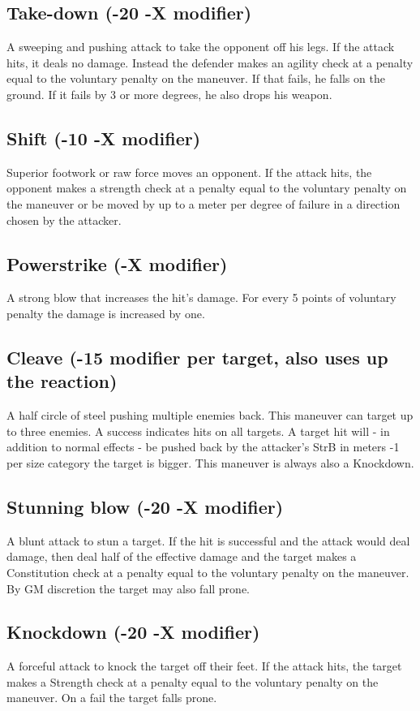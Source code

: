 \documentclass[12pt,a4paper,openany]{book}
\begin{document}
	\subsection*{Take-down (-20 -X modifier)}
	A sweeping and pushing attack to take the opponent off his legs. If the attack hits, it deals no damage. Instead the defender makes an agility check at a penalty equal to the voluntary penalty on the maneuver. If that fails, he falls on the ground. If it fails by 3 or more degrees, he also drops his weapon.
	\subsection*{Shift (-10 -X modifier)}
	Superior footwork or raw force moves an opponent. If the attack hits, the opponent makes a strength check at a penalty equal to the voluntary penalty on the maneuver or be moved by up to a meter per degree of failure in a direction chosen by the attacker.
	\subsection*{Powerstrike (-X modifier)}
	A strong blow that increases the hit’s damage. For every 5 points of voluntary penalty the damage is increased by one.
	\subsection*{Cleave (-15 modifier per target, also uses up the reaction)}
	A half circle of steel pushing multiple enemies back. This maneuver can target up to three enemies. A success indicates hits on all targets. A target hit will - in addition to normal effects - be pushed back by the attacker’s StrB in meters -1 per size category the target is bigger. This maneuver is always also a Knockdown.
	\subsection*{Stunning blow (-20 -X modifier)}
	A blunt attack to stun a target. If the hit is successful and the attack would deal damage, then deal half of the effective damage and the target makes a Constitution check at a penalty equal to the voluntary penalty on the maneuver. By GM discretion the target may also fall prone.
	\subsection*{Knockdown (-20 -X modifier)}
	A forceful attack to knock the target off their feet. If the attack hits, the target makes a Strength check at a penalty equal to the voluntary penalty on the maneuver. On a fail the target falls prone.
\end{document}
